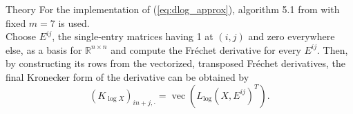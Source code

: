 \begin{chapter}{Theory}
For the implementation of (\ref{eq:dlog_approx}), algorithm 5.1 from \cite{AlmohyFrechet} with fixed $m=7$ is used.\\

Choose $E^{ij}$, the single-entry
matrices having 1 at $(i,j)$ and zero everywhere else, as a basis for $\mathbb{R}^{n\times n}$ and compute the
Fr\'{e}chet derivative for every $E^{ij}$. Then, by constructing its rows from the vectorized, transposed Fr\'{e}chet derivatives, the final Kronecker form of the derivative can be obtained by
\begin{equation}
    \left(K_{\log X}\right)_{in + j,\cdot} = \operatorname{vec}\left(L_{\log}(X,E^{ij})^T\right).
\end{equation}








\end{chapter}
